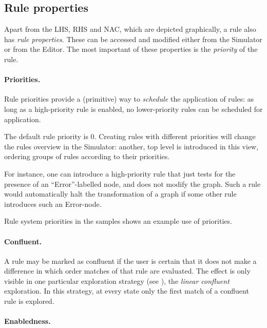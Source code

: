 
\subsection{Rule properties}

Apart from the LHS, RHS and NAC, which are depicted graphically, a rule also
has \emph{rule properties}. These can be accessed and modified either from the
Simulator or from the Editor. The most important of these properties is the
\emph{priority} of the rule. 

\paragraph{Priorities.}

Rule priorities provide a (primitive) way to
\emph{schedule} the application of rules: as long as a high-priority rule is
enabled, no lower-priority rules can be scheduled for application.

The default rule priority is 0. Creating rules with different priorities will
change the rules overview in the Simulator: another, top level is introduced in
this view, ordering groups of rules according to their priorities.

For instance, one can introduce a high-priority rule that just tests for the
presence of an ``\textsf{Error}''-labelled node, and does not modify the
graph. Such a rule would automatically halt the transformation of a graph if
some other rule introduces such an \textsf{Error}-node.

Rule system \textsf{priorities} in the \Groove{} samples shows an example use
of priorities.

\paragraph{Confluent.}

A rule may be marked as confluent if the user is certain that it does not
make a difference in which order matches of that rule are evaluated. The effect
is only visible in one particular exploration strategy (see ),
the \emph{linear confluent} exploration. In this strategy, at every state only
the first match of a confluent rule is explored.

\paragraph{Enabledness.}

